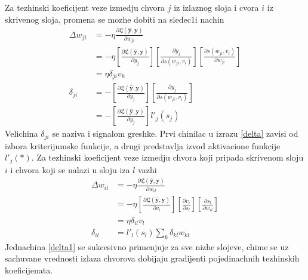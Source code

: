 \documentclass[a4paper, openany, oneside, 11pt]{book}
\begin{document}
Za tezhinski koeficijent veze izmedju chvora $j$ iz izlaznog sloja i cvora $i$ iz skrivenog sloja, promena se mozhe dobiti na sledec1i nachin
\begin{align}
\Delta w_{ji} &= -\eta\frac{\partial \mathfrak{L}\left(\mathbf{\hat{y}}, \mathbf{y}\right)}{\partial w_{ji}}\\
&=-\eta\left[\frac{\partial \mathfrak{L}\left(\mathbf{\hat{y}}, \mathbf{y}\right)}{\partial y_j}\right]\left[\frac{\partial y_j}{\partial s(w_{ji},v_i)}\right]\left[\frac{\partial s(w_{ji},v_i)}{\partial w_{ji}}\right]\\
&=\eta \delta_{ji}v_h\\
\delta_{ji} &=-\left[\frac{\partial \mathfrak{L}\left(\mathbf{\hat{y}}, \mathbf{y}\right)}{\partial y_j}\right]\left[\frac{\partial y_j}{\partial s(w_{ji},v_i)}\right] \label{delta}\\
&= -\left[\frac{\partial \mathfrak{L}\left(\mathbf{\hat{y}}, \mathbf{y}\right)}{\partial y_j}\right]l'_j(s_j)
\end{align}
Velichina $\delta_{ji}$ se naziva i signalom greshke. Prvi chinilac u izrazu \ref{delta} zavisi od izbora kriterijumske funkcije, a drugi predstavlja izvod aktivacione funkcije $l'_j(*)$. Za tezhinski koeficijent veze izmedju chvora koji pripada skrivenom sloju $i$ i chvora koji se nalazi u sloju iza $l$ vazhi
\begin{align}
\Delta w_{il} &= -\eta\frac{\partial \mathfrak{L}\left(\mathbf{\hat{y}}, \mathbf{y}\right)}{\partial w_{il}}\\
&=-\eta\left[\frac{\partial \mathfrak{L}\left(\mathbf{\hat{y}}, \mathbf{y}\right)}{\partial v_i}\right]\left[\frac{\partial v_i}{\partial s_l}\right]\left[\frac{\partial s_l}{\partial w_{il}}\right]\\
&=\eta \delta_{il}v_l\\
\delta_{il} &= l'_l(s_l)\sum_{k}\delta_{kl}w_{kl}\label{delta1}
\end{align}
Jednachina \ref{delta1} se sukcesivno primenjuje za sve nizhe slojeve, chime se uz sachuvane vrednosti izlaza chvorova dobijaju gradijenti pojedinachnih tezhinskih koeficijenata.
\end{document}
